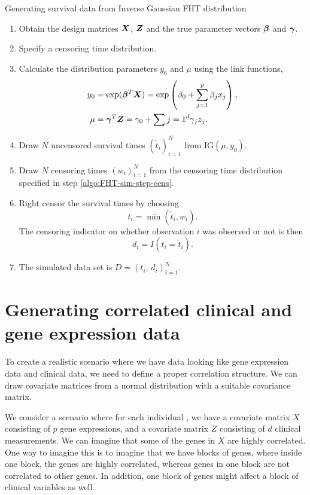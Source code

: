\begin{algorithm}
\caption{Generating survival data from Inverse Gaussian FHT distribution}
\label{algo:FHT-sim}
\begin{enumerate}
    \item Obtain the design matrices $\bm{X}$, $\bm{Z}$ and the true parameter vectors $\boldsymbol{\beta}$ and $\boldsymbol{\gamma}$.
    \item\label{algo:FHT-sim-step-cens} Specify a censoring time distribution.
    \item Calculate the distribution parameters $y_0$ and $\mu$ using the link functions,
        \begin{align*}
            y_0&=\exp(\boldsymbol{\beta}^T\bm{X})=\exp\left(\beta_0+\sum_{j=1}^p\beta_jx_j\right), \\
            \mu&=\boldsymbol{\gamma}^T\bm{Z}=\gamma_0+\sum{j=1}^d\gamma_jz_j.
        \end{align*}
    \item Draw $N$ uncensored survival times $(\tilde{t}_i)_{i=1}^N$ from IG$(\mu,y_0)$.
    \item Draw $N$ censoring times $(w_i)_{i=1}^N$ from the censoring time distribution specified in step \ref{algo:FHT-sim-step-cens}.
    \item Right censor the survival times by choosing
            \begin{equation*}
                t_i=\min(\tilde{t}_i,w_i).
            \end{equation*}
          The censoring indicator on whether observation $i$ was observed or not is then
          \begin{equation*}
            d_i=I(t_i=\tilde{t}_i).
          \end{equation*}
    \item The simulated data set is $D=(t_i,\,d_i)_{i=1}^N$.
\end{enumerate}
\end{algorithm}

\section{Generating correlated clinical and gene expression data}
To create a realistic scenario where we have data looking like gene expression data and clinical data, we need to define a proper correlation structure.
We can draw covariate matrices from a normal distribution with a suitable covariance matrix.

We consider a scenario where for each individual , we have a covariate matrix $X$ consisting of $p$ gene expressions, and a covariate matrix $Z$ consisting of $d$ clinical measurements.
We can imagine that some of the genes in $X$ are highly correlated.
One way to imagine this is to imagine that we have blocks of genes,
where inside one block, the genes are highly correlated, whereas genes in one block are not correlated to other genes.
In addition, one block of genes might affect a block of clinical variables as well.

